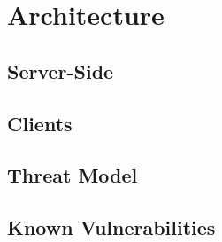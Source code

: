 \chapter{Architecture} \label{chap:architecture}

\section{Server-Side}

\section{Clients}

\section{Threat Model}

\section{Known Vulnerabilities}
